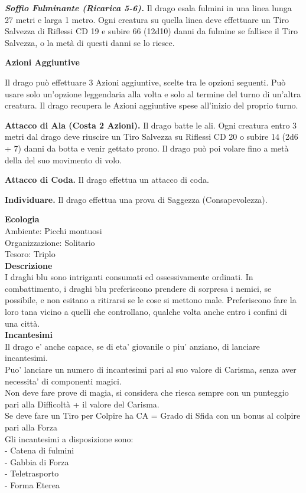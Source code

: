\begin{multicols}{2}
\emph{\textbf{Soffio Fulminante (Ricarica 5-6).}} Il drago esala fulmini in una linea lunga 27 metri e larga 1 metro. Ogni creatura su quella linea deve effettuare un Tiro Salvezza di Riflessi CD 19 e subire 66 (12d10) danni da fulmine se fallisce il Tiro Salvezza, o la metà di questi danni se lo riesce.

\textbf{Azioni Aggiuntive}

Il drago può effettuare 3 Azioni aggiuntive, scelte tra le opzioni seguenti. Può usare solo un'opzione leggendaria alla volta e solo al termine del turno di un'altra creatura. Il drago recupera le Azioni aggiuntive spese all'inizio del proprio turno.

\textbf{Attacco di Ala (Costa 2 Azioni).} Il drago batte le ali. Ogni creatura entro 3 metri dal drago deve riuscire un Tiro Salvezza su Riflessi CD 20 o subire 14 (2d6 + 7) danni da botta e venir gettato prono. Il drago può poi volare fino a metà della del suo movimento di  volo.

\textbf{Attacco di Coda.} Il drago effettua un attacco di coda.

\textbf{Individuare.} Il drago effettua una prova di Saggezza (Consapevolezza).

\textbf{Ecologia}\\
Ambiente: Picchi montuosi\\
Organizzazione: Solitario\\
Tesoro: Triplo\\
\textbf{Descrizione}\\
I draghi blu sono intriganti consumati ed ossessivamente ordinati. In combattimento, i draghi blu preferiscono prendere di sorpresa i nemici, se possibile, e non esitano a ritirarsi se le cose si mettono male. Preferiscono fare la loro tana vicino a quelli che controllano, qualche volta anche entro i confini di una città.\\
\textbf{Incantesimi}\\
Il drago e' anche capace, se di eta' giovanile o piu' anziano, di lanciare incantesimi.\\
Puo' lanciare un numero di incantesimi pari al suo valore di Carisma, senza aver necessita' di componenti magici.\\
Non deve fare prove di magia, si considera che riesca sempre con un punteggio pari alla Difficoltà + il valore del Carisma.\\
Se deve fare un Tiro per Colpire ha CA = Grado di Sfida con un bonus al colpire pari alla Forza\\
Gli incantesimi a disposizione sono:\\
- Catena di fulmini\\
- Gabbia di Forza\\
- Teletrasporto\\
- Forma Eterea\\



\end{multicols}
